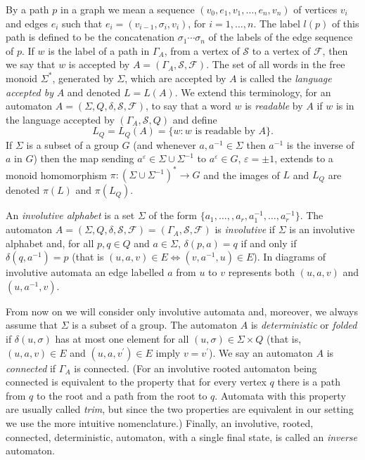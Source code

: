 \documentclass[a4paper,12pt]{article}
\newcommand{\G}{\Gamma }
\renewcommand{\d}{\delta }
\newcommand{\e}{\varepsilon }
\newcommand{\s}{\sigma }
\renewcommand{\S}{\Sigma }
\newcommand{\cF}{{\cal{F}}}
\newcommand{\cS}{{\cal{S}}}
\numberwithin{equation}{section}
\numberwithin{figure}{section}
\renewcommand{\cF}{\mathcal{F}}
\renewcommand{\cS}{\mathcal{S}}
\newcommand{\maps}{\rightarrow}
\begin{document}
By a path $p$
in a graph we mean a sequence $(v_0,e_1,v_1, \ldots , e_n ,v_n)$ of
 vertices $v_i$ and edges $e_i$ such that
 $e_i=(v_{i-1},\s_i,v_i)$, for $i=1,\ldots ,n$.
The
label $l(p)$ of this  path is defined to be
 the concatenation $\s_1\cdots \s_n$ of the labels of the
edge sequence of $p$.  If $w$ is the label of a path
in $\G_A$, from a vertex of $\cS$ to a vertex of $\cF$, then we
say that $w$ is accepted by $A=(\G_A,\cS,\cF)$. The set of all
words in the free monoid $\S^*$, generated by $\S$, which are
accepted by $A$  is called
the {\em language accepted by} $A$ and denoted $L=L(A)$.
We extend this terminology, for an automaton
$A=(\S,Q,\d,\mathcal{S},\mathcal{F})$,
to say that a  word $w$ is {\em readable}
by $A$ if $w$ is in the
language accepted by $(\G_A,\cS,Q)$  and define
\[L_Q=L_Q(A)=\{w:w \textrm{ is readable by } A\}.\]
If $\S$ is a
subset of a group $G$ (and whenever $a,a^{-1}\in \S$ then $a^{-1}$ is
the inverse of $a$ in $G$)
 then the map sending $a^\e\in \S\cup \S^{-1}$ to $a^\e\in G$, $\e=\pm 1$, extends to
a monoid homomorphism $\pi: (\S\cup\S^{-1})^*\maps G$ and the images
of $L$ and $L_Q$ are denoted $\pi(L)$ and $\pi(L_Q)$. 


An {\em involutive alphabet} is a set $\S$ of the form $\{a_1, \ldots, ,
a_r, a_1^{-1}, \ldots, a_r^{-1}\}$.
The automaton $A =(\S, Q, \d,\mathcal{S},\mathcal{F})
= (\G_A, \mathcal{S}, \mathcal{F})$ is {\em
involutive} if $\S$ is an
involutive alphabet and, for all $p, q \in Q$ and $a \in \S$,
$\d(p,a)=q$ if and only if $\d(q, a^{-1})=p$ (that is $(u, a, v) \in E
\Leftrightarrow (v, a^{-1}, u) \in E$).
In diagrams of involutive automata an edge labelled $a$  from
$u$ to $v$  represents
both $(u,a,v)$ and $(u,a^{-1},v)$.

From now on we will
consider only involutive automata and, moreover, we always assume that $\S$ is a subset of a group.
The automaton $A$
is {\em deterministic}  or {\em folded} if $\d(u,\s)$
 has at most  one element for all $(u,\s)\in \S\times Q$
 (that is, $(u, a, v)
\in E$ and $(u, a, v^\prime) \in E$ imply $v=v^\prime$).
We say an automaton $A$ is \emph{connected} if $\G_A$ is connected.
(For an involutive rooted automaton being connected is equivalent to the property that
for every vertex $q$ there is a path from $q$ to the root and a path from the root to $q$.
Automata with this property are usually called \emph{trim}, but since the two properties are
equivalent in our setting we use the more intuitive nomenclature.)
Finally, an involutive, rooted, connected, deterministic,
automaton, with a single final state, is called an {\em inverse}
automaton.
\end{document}
